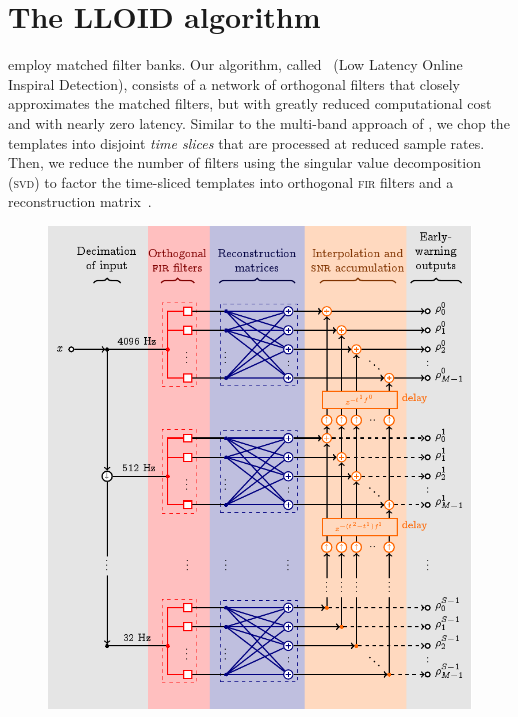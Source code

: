 \documentclass[portrait,plainboxedsections]{sciposter}
\begin{document}
\begin{minipage}[t]{0.4\textwidth}

\section*{The LLOID algorithm}

 employ matched
filter banks.
Our algorithm, called \lloid{}~(Low Latency Online Inspiral Detection),
consists of a network of orthogonal filters that closely approximates the matched filters, but with greatly reduced computational cost and with nearly zero latency.
Similar to the multi-band approach of \citet{Buskulic2010}, we chop the templates into
disjoint \emph{time slices} that are processed at reduced sample rates.
Then, we reduce the number of filters using the singular value decomposition (\textsc{svd}) to factor the time-sliced templates
into orthogonal \textsc{fir} filters and a reconstruction matrix~\citep{Cannon:2010p10398}.
\begin{figure}[h!]
	\begin{center}
		\includegraphics[width=\textwidth]{figures/lloid-diagram}

\end{center}
\end{figure}
\end{minipage}
\end{document}
